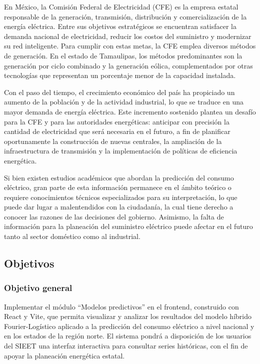 En México, la Comisión Federal de Electricidad (CFE) es la empresa estatal responsable de la generación, transmisión, distribución y comercialización de la energía eléctrica. Entre sus objetivos estratégicos se encuentran satisfacer la demanda nacional de electricidad, reducir los costos del suministro y modernizar su red inteligente\cite{cfe2024}. Para cumplir con estas metas, la CFE emplea diversos métodos de generación. En el estado de Tamaulipas, los métodos predominantes son la generación por ciclo combinado y la generación eólica, complementados por otras tecnologías que representan un porcentaje menor de la capacidad instalada\cite{sener2024}.

Con el paso del tiempo, el crecimiento económico del país ha propiciado un aumento de la población y de la actividad industrial, lo que se traduce en una mayor demanda de energía eléctrica. Este incremento sostenido plantea un desafío para la CFE y para las autoridades energéticas: anticipar con precisión la cantidad de electricidad que será necesaria en el futuro, a fin de planificar oportunamente la construcción de nuevas centrales, la ampliación de la infraestructura de transmisión y la implementación de políticas de eficiencia energética.

Si bien existen estudios académicos que abordan la predicción del consumo eléctrico, gran parte de esta información permanece en el ámbito teórico o requiere conocimientos técnicos especializados para su interpretación, lo que puede dar lugar a malentendidos con la ciudadanía, la cual tiene derecho a conocer las razones de las decisiones del gobierno. Asimismo, la falta de información para la planeación del suministro eléctrico puede afectar en el futuro tanto al sector doméstico como al industrial.


\subsection{Objetivos} \label{sec:objetivos} %

\subsubsection{Objetivo general} \label{subsec:objetivo_general}
Implementar el módulo ``Modelos predictivos'' en el frontend, construido con React y Vite, que permita visualizar y analizar los resultados del modelo híbrido Fourier-Logístico aplicado a la predicción del consumo eléctrico a nivel nacional y en los estados de la región norte. El sistema pondrá a disposición de los usuarios del SIEET una interfaz interactiva para consultar series históricas, con el fin de apoyar la planeación energética estatal.


